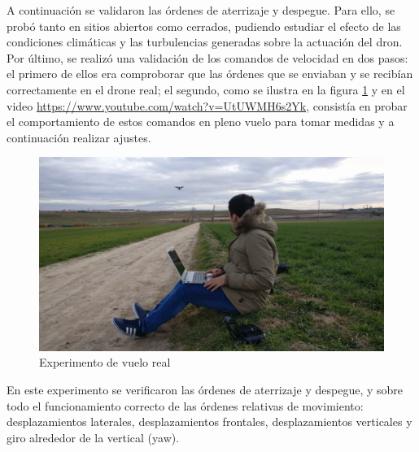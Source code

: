 A continuación se validaron las órdenes de aterrizaje y despegue. Para ello, se probó tanto en sitios abiertos como cerrados, pudiendo estudiar el efecto de las condiciones climáticas y las turbulencias generadas sobre la actuación del dron. Por último, se realizó una validación de los comandos de velocidad en dos pasos: el primero de ellos era comproborar que las órdenes que se enviaban y se recibían correctamente en el drone real; el segundo, como se ilustra en la figura \ref{fig:experimentoConjunto} y en el video \url{https://www.youtube.com/watch?v=UtUWMH6s2Yk}, consistía en probar el comportamiento de estos comandos en pleno vuelo para tomar medidas y a continuación realizar ajustes.   

\begin{figure}[H]
  \centering
  \includegraphics[scale=0.25]{imagenes/EXP2.png}
  \caption{Experimento de vuelo real}
  \label{fig:experimentoConjunto}
\end{figure}

En este experimento se verificaron las órdenes de aterrizaje y despegue, y sobre todo el funcionamiento correcto de las órdenes relativas de movimiento: desplazamientos laterales, desplazamientos frontales, desplazamientos verticales y giro alrededor de la vertical (yaw).